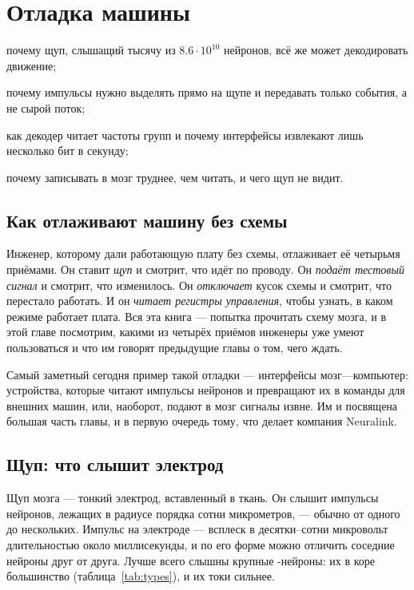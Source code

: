 \chapter{Отладка машины}
\label{sec:debugging}
\begin{chaptergoals}
\item почему щуп, слышащий тысячу из $8.6\cdot10^{10}$ нейронов, всё же может декодировать движение;
\item почему импульсы нужно выделять прямо на щупе и передавать только события, а не сырой поток;
\item как декодер читает частоты групп и почему интерфейсы извлекают лишь несколько бит в секунду;
\item почему записывать в мозг труднее, чем читать, и чего щуп не видит.
\end{chaptergoals}

\section{Как отлаживают машину без схемы}

Инженер, которому дали работающую плату без схемы, отлаживает её четырьмя приёмами. Он ставит \emph{щуп} и смотрит, что идёт по проводу. Он \emph{подаёт тестовый сигнал} и смотрит, что изменилось. Он \emph{отключает} кусок схемы и смотрит, что перестало работать. И он \emph{читает регистры управления}, чтобы узнать, в каком режиме работает плата. Вся эта книга --- попытка прочитать схему мозга, и в этой главе посмотрим, какими из четырёх приёмов инженеры уже умеют пользоваться и что им говорят предыдущие главы о том, чего ждать.

Самый заметный сегодня пример такой отладки --- интерфейсы мозг---компьютер: устройства, которые читают импульсы нейронов и превращают их в команды для внешних машин, или, наоборот, подают в мозг сигналы извне. Им и посвящена большая часть главы, и в первую очередь тому, что делает компания Neuralink.

\section{Щуп: что слышит электрод}

Щуп мозга --- тонкий электрод, вставленный в ткань. Он слышит импульсы нейронов, лежащих в радиусе порядка сотни микрометров, --- обычно от одного до нескольких. Импульс на электроде --- всплеск в десятки--сотни микровольт длительностью около миллисекунды, и по его форме можно отличить соседние нейроны друг от друга. Лучше всего слышны крупные -нейроны: их в коре большинство (таблица~\ref{tab:types}), и их токи сильнее.

